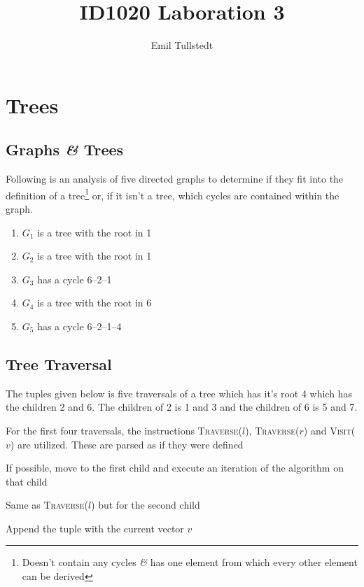 \documentclass[a4paper,11pt]{article}
\title{ID1020 Laboration 3}
\author{Emil Tullstedt}
\begin{document}
\maketitle

\newpage

\tableofcontents

\newpage

\section{Trees}
\label{sec:trees}

\subsection{Graphs \textit{\&} Trees}

Following is an analysis of five directed graphs to determine if they fit into the definition of a tree\footnote{Doesn't contain any cycles \textit{\&} has one element from which every other element can be derived} or, if it isn't a tree, which cycles are contained within the graph.

\begin{enumerate}[label=\bfseries Graph \arabic*:]
\item $G_1$ is a tree with the root in 1
\item $G_2$ is a tree with the root in 1
\item $G_3$ has a cycle 6--2--1
\item $G_4$ is a tree with the root in 6
\item $G_5$ has a cycle 6--2--1--4
\end{enumerate}
\newpage
\subsection{Tree Traversal}

The tuples given below is five traversals of a tree which has it's root 4 which has the children 2 and 6. The children of 2 is 1 and 3 and the children of 6 is 5 and 7.

For the first four traversals, the instructions \textsc{Traverse}($l$), \textsc{Traverse}($r$) and \textsc{Visit}($v$) are utilized. These are parsed as if they were defined

\begin{description}[style=multiline,leftmargin=3cm]
\item[\textsc{Traverse}($l$)] If possible, move to the first child and execute an iteration of the algorithm on that child
\item[\textsc{Traverse}($r$)] Same as \textsc{Traverse}($l$) but for the second child
\item[\textsc{Visit}($v$)] Append the tuple with the current vector $v$
\end{description}
\end{document}
